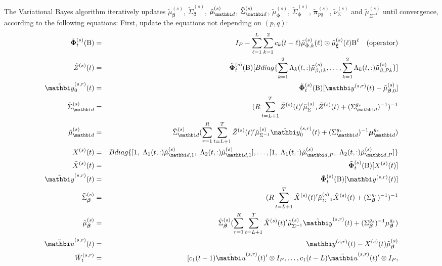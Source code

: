 \documentclass[12pt,titlepage,fleqn]{article}
\newcommand{\1}{{\bm 1}}
\newcommand{\vy}{\mathbi y}
\newcommand{\vu}{\mathbi u}
\newcommand{\vd}{\mathbi d}
\newcommand{\vbeta}{\boldsymbol \beta}
\newcommand{\vPhi}{\boldsymbol \Phi}
\newcommand{\vphi}{\boldsymbol \phi}
\newcommand{\vxi}{\boldsymbol \xi}
\newcommand{\vmu}{\boldsymbol{\mu}}
\newcommand{\vpi}{\boldsymbol{\pi}}
\newcommand{\gs}{^{g_s}}
\newcommand{\s}{^{(s)}}
\newcommand{\sr}{^{(s,r)}}
\begin{document}
{The Variational Bayes algorithm iteratively updates $\tilde{\mu}_{\vbeta}\s$, $\tilde{\Sigma}_{\vbeta}\s$, $\tilde{\mu}_{\vd}\s$, $\tilde{\Sigma}_{\vd}\s$, $\tilde{\mu}_{\vphi}\s$, $\tilde{\Sigma}_{\vphi}\s$, $\tilde{\vpi}_{pq}\s$, $\tilde{\nu}_{\Sigma}\s$ and $\tilde{\mu}_{\Sigma^{-1}}\s$ until convergence, according to the following equations: 
First, update the equations not depending on $(p,q)$: 
\begin{eqnarray*}
\tilde{\vPhi}_t\s(\text{B}) &=& I_P - \sum_{\ell=1}^L\sum_{k=1}^2 c_k(t-\ell)\tilde{\mu}_{\Phi,k}\s(\ell)\odot \tilde{\mu}_{\vxi}\s(\ell)\text{B}^{\ell} ~~~\text{(operator)}\\ 
\tilde{Z}\s(t)&=& \tilde{\vPhi}_t\s(\text{B})[Bdiag\{\sum_{k=1}^2\Lambda_k(t,:)\tilde{\mu}_{\beta,1k}\s, \dots, \sum_{k=1}^2\Lambda_k(t,:)\tilde{\mu}_{\beta,Pk}\s\}]\\
\tilde{\vy}_0\sr(t) & = & \tilde{\vPhi}_t\s(\text{B})[\vy\sr(t) - \tilde{\mu}_{\vbeta,0}\s]\\
\tilde{\Sigma}_{\vd}\s&=& (R\sum_{t=L+1}^{T}\tilde{Z}\s(t)'\tilde{\mu}_{\Sigma^{-1}}\s\tilde{Z}\s(t)+(\Sigma_{\vd}\gs)^{-1})^{-1} \\
\tilde{\mu}_{\vd}\s &=& \tilde{\Sigma}_{\vd}\s(\sum_{r=1}^{R}\sum_{t=L+1}^{T}\tilde{Z}\s(t)'\tilde{\mu}_{\Sigma^{-1}}\s\tilde{\vy}_0\sr(t)+(\Sigma_{\vd}\gs)^{-1}\vmu_{\vd}\gs)\\
X\s(t)&=& Bdiag\{[1,~\Lambda_1(t,:)\tilde{\mu}_{\vd,1}\s, ~\Lambda_2(t,:)\tilde{\mu}_{\vd,1}\s], \dots, [1,~\Lambda_1(t,:)\tilde{\mu}_{\vd,P}\s, ~\Lambda_2(t,:)\tilde{\mu}_{\vd,P}\s]\}\\
\tilde{X}\s(t)&=& \tilde{\vPhi}_t\s(\text{B})[X\s(t)]\\
\tilde{\vy}\sr(t) & = & \tilde{\vPhi}_t\s(\text{B})[\vy\sr(t)]\\
\tilde{\Sigma}_{\vbeta}\s &=& (R\sum_{t=L+1}^{T}\tilde{X}\s(t)'\tilde{\mu}_{\Sigma^{-1}}\s\tilde{X}\s(t)+(\Sigma_{\vbeta}\gs)^{-1})^{-1} \\
\tilde{\mu}_{\vbeta}\s &=& \tilde{\Sigma}_{\vbeta}\s(\sum_{r=1}^{R}\sum_{t=L+1}^{T}\tilde{X}\s(t)'\tilde{\mu}_{\Sigma^{-1}}\s\tilde{\vy}\sr(t)+(\Sigma_{\vbeta}\gs)^{-1}\mu_{\vbeta}\gs)\\
\tilde{\vu}\sr(t)&=& \vy\sr(t) - X\s(t)\tilde{\mu}_{\vbeta}\s\\
\tilde{W}_t\sr &=& [c_1(t-1)\tilde{\vu}\sr(t)'\otimes I_P, \dots,  c_1(t-L)\tilde{\vu}\sr(t)'\otimes I_P, \\

\end{eqnarray*}}
\end{document}
